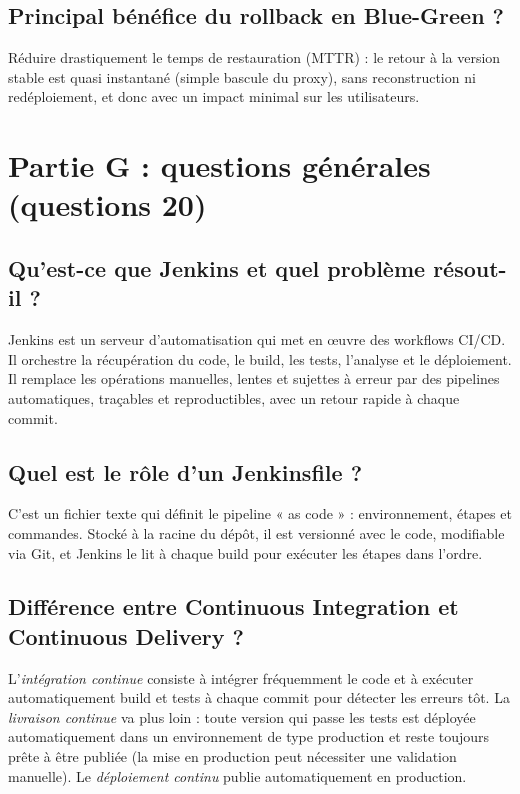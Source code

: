 \documentclass[11pt,a4paper]{article}
\begin{document}
\subsection{Principal bénéfice du rollback en Blue-Green ?}
Réduire drastiquement le temps de restauration (MTTR) : le retour à la version stable est
quasi instantané (simple bascule du proxy), sans reconstruction ni redéploiement, et donc
avec un impact minimal sur les utilisateurs.

\section{Partie G : questions générales (questions 20)}

\subsection{Qu'est-ce que Jenkins et quel problème résout-il ?}
Jenkins est un serveur d'automatisation qui met en œuvre des workflows CI/CD. Il
orchestre la récupération du code, le build, les tests, l'analyse et le déploiement. Il
remplace les opérations manuelles, lentes et sujettes à erreur par des pipelines
automatiques, traçables et reproductibles, avec un retour rapide à chaque commit.

\subsection{Quel est le rôle d'un Jenkinsfile ?}
C'est un fichier texte qui définit le pipeline « as code » : environnement, étapes et
commandes. Stocké à la racine du dépôt, il est versionné avec le code, modifiable via
Git, et Jenkins le lit à chaque build pour exécuter les étapes dans l'ordre.

\subsection{Différence entre Continuous Integration et Continuous Delivery ?}
L'\emph{intégration continue} consiste à intégrer fréquemment le code et à exécuter
automatiquement build et tests à chaque commit pour détecter les erreurs tôt. La
\emph{livraison continue} va plus loin : toute version qui passe les tests est déployée
automatiquement dans un environnement de type production et reste toujours prête à être
publiée (la mise en production peut nécessiter une validation manuelle). Le
\emph{déploiement continu} publie automatiquement en production.
\end{document}
